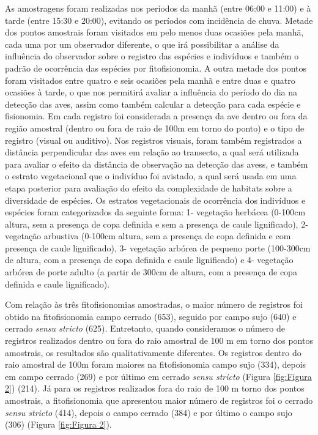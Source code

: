As amostragens foram realizadas nos períodos da manhã (entre 06:00 e 11:00) e à tarde (entre 15:30 e 20:00), evitando os períodos com incidência de chuva. Metade dos pontos amostrais foram visitados em pelo menos duas ocasiões pela manhã, cada uma por um observador diferente, o que irá possibilitar a análise da influência do observador sobre o registro das espécies e indivíduos e também o padrão de ocorrência das espécies por fitofisionomia. A outra metade dos pontos foram visitados entre quatro e seis ocasiões pela manhã e entre duas e quatro ocasiões à tarde, o que nos permitirá avaliar a influência do período do dia na detecção das aves, assim como também calcular a detecção para cada espécie e fisionomia. Em cada registro foi considerada a presença da ave dentro ou fora da região amostral (dentro ou fora de raio de 100m em torno do ponto) e o tipo de registro (visual ou auditivo). Nos registros visuais, foram também registrados a distância perpendicular das aves em relação ao transecto, a qual será utilizada para avaliar o efeito da distância de observação na detecção das avess, e também o estrato vegetacional que o indivíduo foi avistado, a qual será usada em uma etapa posterior para avaliação do efeito da complexidade de habitats sobre a diversidade de espécies. Os estratos vegetacionais de ocorrência dos indivíduos e espécies foram categorizados da seguinte forma: 1- vegetação herbácea (0-100cm altura, sem a presença de copa definida e sem a presença de caule lignificado), 2- vegetação arbustiva (0-100cm altura, sem a presença de copa definida e com presença de caule lignificado), 3- vegetação arbórea de pequeno porte (100-300cm de altura, com a presença de copa definida e caule lignificado) e 4- vegetação arbórea de porte adulto (a partir de 300cm de altura, com a presença de copa definida e caule lignificado).

Com relação às três fitofisionomias amostradas, o maior número de registros foi obtido na fitofisionomia campo cerrado (653), seguido por campo sujo (640) e cerrado \textit{sensu stricto} (625). Entretanto, quando consideramos o número de registros realizados dentro ou fora do raio amostral de 100 m em torno dos pontos amostrais, os resultados são qualitativamente diferentes.
Os registros dentro do raio amostral de 100m foram maiores na fitofisionomia campo sujo (334), depois em campo cerrado (269) e por último em cerrado \textit{sensu stricto} (Figura \ref{fig:Figura 2}) (214). Já para os registros realizados fora do raio de 100 m torno dos pontos amostrais, a fitofisionomia que apresentou maior número de registros foi o cerrado \textit{sensu stricto} (414), depois o campo cerrado (384) e por último o campo sujo (306) (Figura \ref{fig:Figura 2}).
